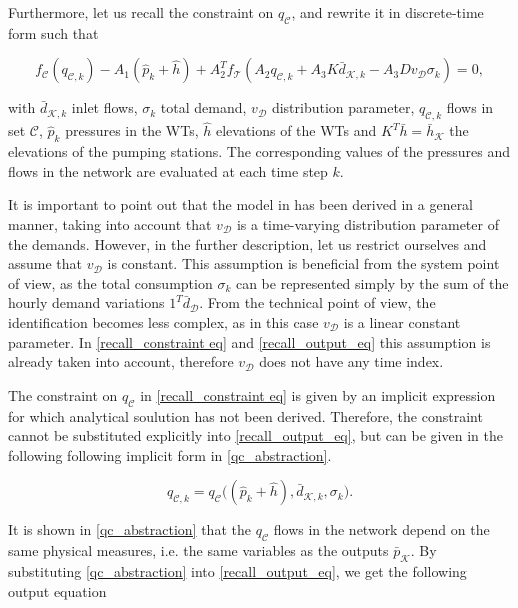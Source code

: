 Furthermore, let us recall the constraint on $q_\mathcal{C}$, and rewrite it in discrete-time form such that

 \begin{equation}
\label{recall_constraint eq}
f_{\mathcal{C}}(q_{\mathcal{C},k}) - A_1(\hat{p}_k + \hat{h}) + A_2^T f_{\mathcal{T}}(A_2 q_{\mathcal{C},k} + A_3 K \bar{d}_{\mathcal{K},k} - A_3 D v_{\mathcal{D}} \sigma_k) = 0,
\end{equation} 

with $\bar{d}_{\mathcal{K},k}$ inlet flows, $\sigma_k$ total demand, $v_{\mathcal{D}}$ distribution parameter, $q_{\mathcal{C},k}$ flows in set $\mathcal{C}$, $\hat{p}_k$ pressures in the WTs, $\hat{h}$ elevations of the WTs and $K^T\bar{h} = \bar{h}_{\mathcal{K}} $ the elevations of the pumping stations. The corresponding values of the pressures and flows in the network are evaluated at each time step $k$. 

It is important to point out that the model in  has been derived in a general manner, taking into account that $v_{\mathcal{D}}$ is a time-varying distribution parameter of the demands. However, in the further description, let us restrict ourselves and assume that $v_{\mathcal{D}}$ is constant. This assumption is beneficial from the system point of view, as the total consumption $\sigma_k$ can be represented simply by the sum of the hourly demand variations $1^T \bar{d}_{\mathcal{D}}$. From the technical point of view, the identification becomes less complex, as in this case $v_{\mathcal{D}}$ is a linear constant parameter. In \eqref{recall_constraint eq} and \eqref{recall_output_eq} this assumption is already taken into account, therefore $v_{\mathcal{D}}$ does not have any time index. 

The constraint on $q_\mathcal{C}$ in \eqref{recall_constraint eq} is given by an implicit expression for which analytical soulution has not been derived. Therefore, the constraint cannot be substituted explicitly into \eqref{recall_output_eq}, but can be given in the following following implicit form in \eqref{qc_abstraction}.

 \begin{equation}
\label{qc_abstraction}
q_{\mathcal{C},k} = q_\mathcal{C} \big( (\hat{p}_k + \hat{h}),\bar{d}_{\mathcal{K},k}, \sigma_k\big).
\end{equation} 

It is shown in \eqref{qc_abstraction} that the $q_\mathcal{C}$ flows in the network depend on the same physical measures, i.e. the same variables as the outputs $\bar{p}_{\mathcal{K}}$. By substituting \eqref{qc_abstraction} into \eqref{recall_output_eq}, we get the following output equation

